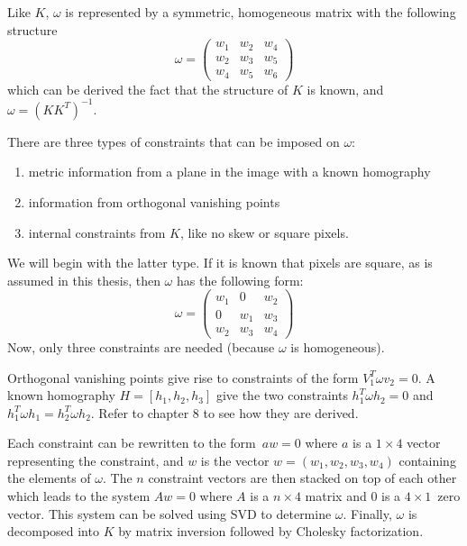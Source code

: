 Like $K$, $\omega$ is represented by a symmetric, homogeneous matrix with the following structure
$$
\omega = \begin{pmatrix}
	w_{1} & w_{2} & w_{4} \\
	w_{2} & w_{3} & w_{5} \\
	w_{4} & w_{5} & w_{6} 
\end{pmatrix}
$$
which can be derived the fact that the structure of $K$ is known, and $\omega = (KK^T)^{-1}$.

There are three types of constraints that can be imposed on $\omega$:
\begin{enumerate}
	\item metric information from a plane in the image with a known homography
	\item information from orthogonal vanishing points
	\item internal constraints from $K$, like no skew or square pixels.
\end{enumerate}

We will begin with the latter type.
If it is known that pixels are square, as is assumed in this thesis, then $\omega$ has the following form:
$$
\omega = \begin{pmatrix}
	w_{1} & 0 & w_{2} \\
	0 & w_{1} & w_{3} \\
	w_{2} & w_{3} & w_{4}
\end{pmatrix}
$$
Now, only three constraints are needed (because $\omega$ is homogeneous).

Orthogonal vanishing points give rise to constraints of the form $V_{1}^T \omega v_{2} = 0$.
A known homography $H=[h_{1},h_{2},h_{3}]$ give the two constraints $h_{1}^T \omega h_{2} = 0$ and $h_{1}^T \omega h_{1} = h_{2}^T \omega h_{2}$. Refer to \cite{hartley-zisserman} chapter 8 to see how they are derived.

Each constraint can be rewritten to the form $aw=0$ where $a$ is a $1 \times 4$ vector representing the constraint, and $w$ is the vector $w = (w_1,w_2,w_3,w_4)$ containing the elements of $\omega$.
The $n$ constraint vectors are then stacked on top of each other which leads to the system $Aw=0$ where $A$ is a $n \times 4$ matrix and $0$ is a $4 \times 1$ zero vector. %
This system can be solved using SVD to determine $\omega$.
Finally, $\omega$ is decomposed into $K$ by matrix inversion followed by Cholesky factorization.\cite[223-226]{hartley-zisserman}

